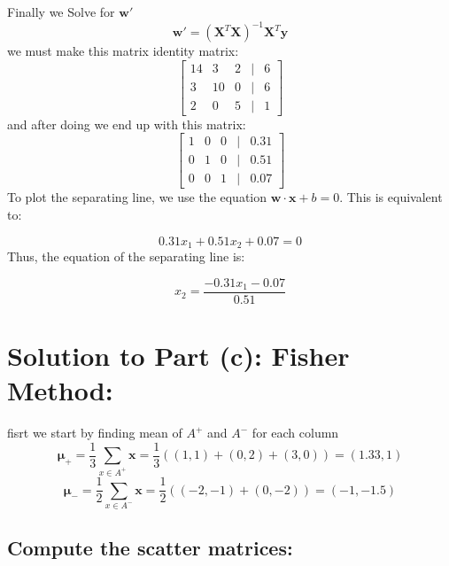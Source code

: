 \documentclass[a4paper, 11pt]{article}
\begin{document}
	Finally we Solve for $\mathbf{w}'$
	\[
	\mathbf{w}' = (\mathbf{X}^T \mathbf{X})^{-1} \mathbf{X}^T \mathbf{y}
	\]
	we must make this matrix identity matrix:
	\[
	\begin{bmatrix}
		14 & 3 & 2 & | & 6\\
		3 & 10 & 0 & | & 6\\
		2 & 0 & 5 & | & 1
	\end{bmatrix}
	\]
	and after doing we end up with this matrix:
	\[
	\begin{bmatrix}
		1 & 0 & 0 & | & 0.31\\
		0 & 1 & 0 & | & 0.51\\
		0 & 0 & 1 & | & 0.07
	\end{bmatrix}
	\]
	To plot the separating line, we use the equation \( \mathbf{w} \cdot \mathbf{x} + b = 0 \). This is equivalent to:
	
	\[
	0.31 x_1 + 0.51 x_2 + 0.07 = 0
	\]
	Thus, the equation of the separating line is:
	
	\[
	x_2 = \frac{-0.31 x_1 - 0.07}{0.51}
	\]
	
	\section*{Solution to Part (c): Fisher Method:}
	
	fisrt we start by finding mean of \(A^+\) and \(A^-\) for each column
	\[
	\mathbf{\mu}_+ = \frac{1}{3} \sum_{x \in A^+} \mathbf{x} = \frac{1}{3} \left( (1,1) + (0,2) + (3,0) \right) = (1.33, 1)
	\]
	\[
	\mathbf{\mu}_- = \frac{1}{2} \sum_{x \in A^-} \mathbf{x} = \frac{1}{2} \left( (-2,-1) + (0,-2) \right) = (-1, -1.5)
	\]
	
	\subsection*{Compute the scatter matrices:}
	
\end{document}
